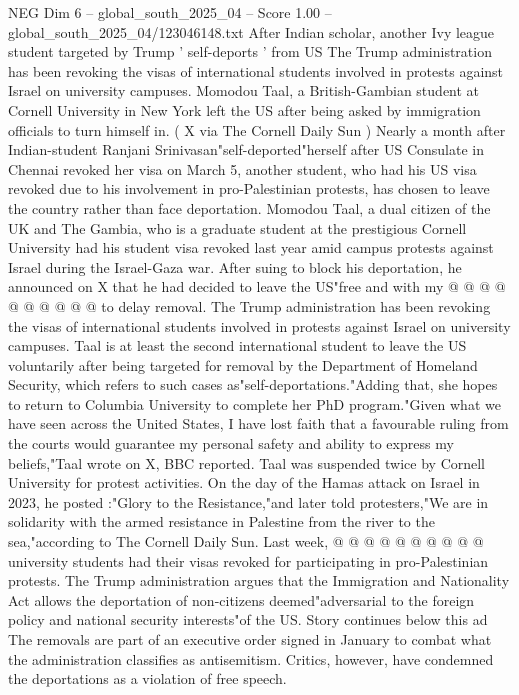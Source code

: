 \begin{textsample}{NEG Dim 6 – global\_south\_2025\_04 – Score 1.00 – global\_south\_2025\_04/123046148.txt}  \label{ex:f6_neg_209}
After Indian scholar, another Ivy league student targeted by Trump ' self-deports ' from US The Trump administration has been revoking the visas of international students involved in protests against Israel on university campuses.
Momodou Taal, a British-Gambian student at Cornell University in New York left the US after being asked by immigration officials to turn himself in. ( X via The Cornell Daily Sun ) Nearly a month after Indian-student Ranjani Srinivasan"self-deported"herself after US Consulate in Chennai revoked her visa on March 5, another student, who had his US visa revoked due to his involvement in pro-Palestinian protests, has chosen to leave the country rather than face deportation.
Momodou Taal, a dual citizen of the UK and The Gambia, who is a graduate student at the prestigious Cornell University had his student visa revoked last year amid campus protests against Israel during the Israel-Gaza war.
After suing to block his deportation, he announced on X that he had decided to leave the US"free and with my @ @ @ @ @ @ @ @ @ @ to delay removal.
The Trump administration has been revoking the visas of international students involved in protests against Israel on university campuses.
Taal is at least the second international student to leave the US voluntarily after being targeted for removal by the Department of Homeland Security, which refers to such cases as"self-deportations."Adding that, she hopes to return to Columbia University to complete her PhD program."Given what we have seen across the United States, I have lost faith that a favourable ruling from the courts would guarantee my personal safety and ability to express my beliefs,"Taal wrote on X, BBC reported.
Taal was suspended twice by Cornell University for protest activities.
On the day of the Hamas attack on Israel in 2023, he posted :"Glory to the Resistance,"and later told protesters,"We are in solidarity with the armed resistance in Palestine from the river to the sea,"according to The Cornell Daily Sun.
Last week, @ @ @ @ @ @ @ @ @ @ university students had their visas revoked for participating in pro-Palestinian protests.
The Trump administration argues that the Immigration and Nationality Act allows the deportation of non-citizens deemed"adversarial to the foreign policy and national security interests"of the US.
Story continues below this ad The removals are part of an executive order signed in January to combat what the administration classifies as antisemitism.
Critics, however, have condemned the deportations as a violation of free speech.

\end{textsample}
